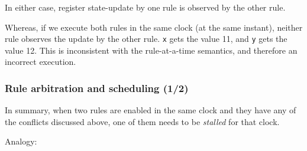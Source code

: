 \begin{frame}[fragile]
\begin{itemize}
       \vspace{1ex}

       In either case, register state-update by one rule is observed
       by the other rule.

       \vspace{1ex}

       Whereas, if we execute both rules in the same clock (at the
       same instant), neither rule observes the update by the other
       rule. {\tt x} gets the value 11, and {\tt y} gets the value 12.
       This is inconsistent with the rule-at-a-time semantics, and
       therefore an incorrect execution.

\end{itemize}

\end{frame}


\begin{frame}[fragile]
\frametitle{Rule arbitration and scheduling (1/2)}

\footnotesize

In summary, when two rules are enabled in the same clock and they have
any of the conflicts discussed above, one of them needs to
be \emph{stalled} for that clock.

\vspace{5ex}

Analogy:

\end{frame}


